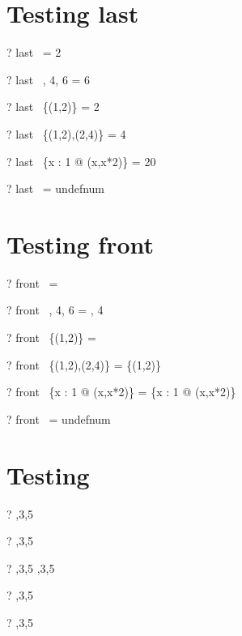 \documentclass{article}
\begin{document}
\section{Testing last}
\begin{zed} \vdash? last~  \rangle = 2 \end{zed}
\begin{zed} \vdash? last~ , 4, 6 \rangle = 6 \end{zed}
\begin{zed} \vdash? last~ \{(1,2)\} = 2 \end{zed}
\begin{zed} \vdash? last~ \{(1,2),(2,4)\} = 4 \end{zed}
\begin{zed} \vdash? last~ \{x : 1  @ (x,x*2)\} = 20 \end{zed}
\begin{zed} \vdash? last~ \langle \rangle = undefnum \end{zed}

\section{Testing front}
\begin{zed} \vdash? front~  \rangle = \emptyset \end{zed}
\begin{zed} \vdash? front~ , 4, 6 \rangle = , 4 \rangle \end{zed}
\begin{zed} \vdash? front~ \{(1,2)\} = \emptyset \end{zed}
\begin{zed} \vdash? front~ \{(1,2),(2,4)\} = \{(1,2)\} \end{zed}
\begin{zed} \vdash? front~ \{x : 1  @ (x,x*2)\} = \{x : 1  @ (x,x*2)\} \end{zed}
\begin{zed} \vdash? front~ \langle \rangle = undefnum \end{zed}


\section{Testing \prefix}
\begin{zed} \vdash? \langle \rangle  \prefix   {},3,5 \rangle \end{zed}
\begin{zed} \vdash?  \rangle  \prefix   {},3,5 \rangle \end{zed}
\begin{zed} \vdash? ,3,5 \rangle  \prefix   {},3,5 \rangle \end{zed}
\begin{zed} \vdash? \lnot {} \rangle  \prefix   {},3,5 \rangle \end{zed}
\begin{zed} \vdash? \lnot {} \rangle  \prefix   {},3,5 \rangle \end{zed}
\end{document}
